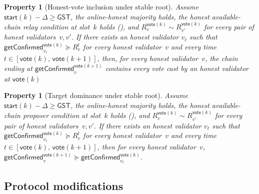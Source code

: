 \ifx\litemode\undefined\documentclass{article}\fi
\newcommand{\start}{\mathsf{start}}
\newcommand{\vote}{\mathsf{vote}}
\newcommand{\getConfirmed}{\textsf{getConfirmed}\xspace}
\theoremstyle{plain}
\newtheorem{property}[theorem]{Property}
\theoremstyle{definition}
\theoremstyle{remark}
\newcommand{\GST}{\ensuremath{\mathsf{GST}}}
\newcommand{\OHM}{online-honest majority\xspace}
\newcommand{\HAP}{honest available-chain proposer\xspace}
\newcommand{\HAR}{honest available-chain relay\xspace}
\begin{document}
\begin{property}[Honest-vote inclusion under stable root]\label{rev:prop:honest-vote-inclusion}
Assume $\start(k) - \Delta \geq \GST$, the \OHM holds, the \HAR condition at slot~$k$ holds (), and $R_v^{\vote(k)} \sim R_{v'}^{\vote(k)}$ for every pair of honest validators~$v, v'$.
If there exists an honest validator $v_\ell$ such that
$\getConfirmed_{v_\ell}^{\vote(k)}\succeq R_{v}^t$ for every honest validator~$v$ and every time $t \in [\vote(k),\, \vote(k+1)]$, then,
for every honest validator~$v$, the chain ending at $\getConfirmed_v^{\vote(k+1)}$ contains every vote cast by an honest validator at $\vote(k)$
\end{property}


\begin{property}[Target dominance under stable root]\label{rev:prop:target-dominance}
Assume $\start(k) - \Delta \geq \GST$, the \OHM holds, the \HAP condition at slot~$k$ holds (), and $R_v^{\vote(k)} \sim R_{v'}^{\vote(k)}$ for every pair of honest validators~$v, v'$.
If there exists an honest validator $v_\ell$ such that $\getConfirmed_{v_\ell}^{\vote(k)} \succeq R_{v}^t$ for every honest validator~$v$ and every time $t \in [\vote(k),\, \vote(k+1)]$, then for every honest validator~$v$, $\getConfirmed_v^{\vote(k+1)} \succeq \getConfirmed_{v_\ell}^{\vote(k)}$.
\end{property}

\subsection{Protocol modifications}\label{rev:sec:healing-protocol}
\end{document}
